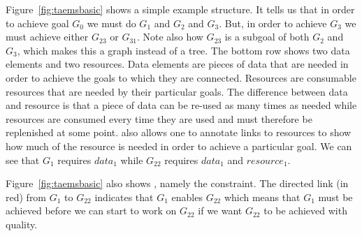 \begin{SCfigure}
\begin{minipage}{1.0\linewidth}
\begin{center}
    \end{center}
  \end{minipage}
  \caption{An example of a simple \taems{} structure.}
  \label{fig:taemsbasic}
\end{SCfigure}


Figure~\ref{fig:taemsbasic} shows a simple example \taems{} structure.
It tells us that in order to achieve goal $G_0$ we must do $G_1$ and
$G_2$ and $G_3$. But, in order to achieve $G_3$ we must achieve either
$G_{23}$ or $G_{31}$. Note also how $G_{23}$ is a subgoal of both
$G_2$ and $G_3$, which makes this a graph instead of a tree. The
bottom row shows two data elements and two resources. Data elements
are pieces of data that are needed in order to achieve the goals to
which they are connected. Resources are consumable resources that are
needed by their particular goals. The difference between data and
resource is that a piece of data can be re-used as many times as
needed while resources are consumed every time they are used and must
therefore be replenished at some point. \taems{} also allows one to
annotate links to resources to show how much of the resource is needed
in order to achieve a particular goal. We can see that $G_1$ requires
$data_1$ while $G_{22}$ requires $data_1$ and $resource_1$.

Figure~\ref{fig:taemsbasic} also shows ,
namely the  constraint. The directed link (in red) from
$G_1$ to $G_{22}$ indicates that $G_1$ enables $G_{22}$ which means
that $G_1$ must be achieved before we can start to work on $G_{22}$ if
we want $G_{22}$ to be achieved with quality.

